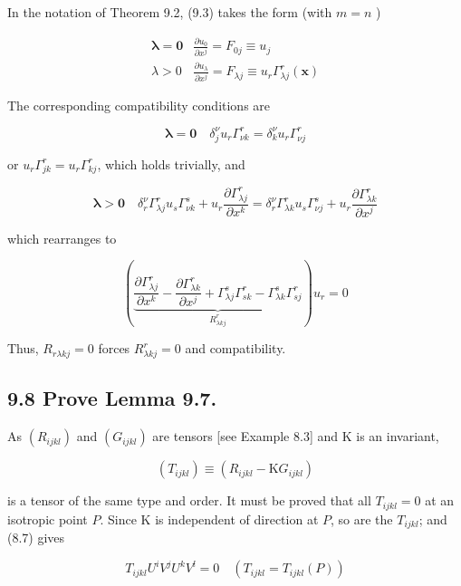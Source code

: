 \documentclass[10pt]{article}
\begin{document}
In the notation of Theorem 9.2, (9.3) takes the form (with $m=n$ )

$$
\begin{array}{ll}
\boldsymbol{\lambda}=\mathbf{0} & \frac{\partial u_{0}}{\partial x^{j}}=F_{0 j} \equiv u_{j} \\
\lambda>0 & \frac{\partial u_{\lambda}}{\partial x^{j}}=F_{\lambda j} \equiv u_{r} \Gamma_{\lambda j}^{r}(\mathbf{x})
\end{array}
$$

The corresponding compatibility conditions are

$$
\boldsymbol{\lambda}=\mathbf{0} \quad \delta_{j}^{\nu} u_{r} \Gamma_{\nu k}^{r}=\delta_{k}^{\nu} u_{r} \Gamma_{\nu j}^{r}
$$

or $u_{r} \Gamma_{j k}^{r}=u_{r} \Gamma_{k j}^{r}$, which holds trivially, and

$$
\boldsymbol{\lambda}>\mathbf{0} \quad \delta_{r}^{\nu} \Gamma_{\lambda j}^{r} u_{s} \Gamma_{\nu k}^{s}+u_{r} \frac{\partial \Gamma_{\lambda j}^{r}}{\partial x^{k}}=\delta_{r}^{\nu} \Gamma_{\lambda k}^{r} u_{s} \Gamma_{\nu j}^{s}+u_{r} \frac{\partial \Gamma_{\lambda k}^{r}}{\partial x^{j}}
$$

which rearranges to

$$
(\underbrace{\frac{\partial \Gamma_{\lambda j}^{r}}{\partial x^{k}}-\frac{\partial \Gamma_{\lambda k}^{r}}{\partial x^{j}}+\Gamma_{\lambda j}^{s} \Gamma_{s k}^{r}-\Gamma_{\lambda k}^{s} \Gamma_{s j}^{r}}_{R_{\lambda k j}^{r}}) u_{r}=0
$$

Thus, $R_{r \lambda k j}=0$ forces $R_{\lambda k j}^{r}=0$ and compatibility.

\subsection*{9.8 Prove Lemma 9.7.}
As $\left(R_{i j k l}\right)$ and $\left(G_{i j k l}\right)$ are tensors [see Example 8.3] and $\mathrm{K}$ is an invariant,

$$
\left(T_{i j k l}\right) \equiv\left(R_{i j k l}-\mathrm{K} G_{i j k l}\right)
$$

is a tensor of the same type and order. It must be proved that all $T_{i j k l}=0$ at an isotropic point $P$. Since $\mathrm{K}$ is independent of direction at $P$, so are the $T_{i j k l}$; and (8.7) gives


\begin{equation*}
T_{i j k l} U^{i} V^{j} U^{k} V^{l}=0 \quad\left(T_{i j k l}=T_{i j k l}(P)\right) \tag{1}
\end{equation*}
\end{document}
